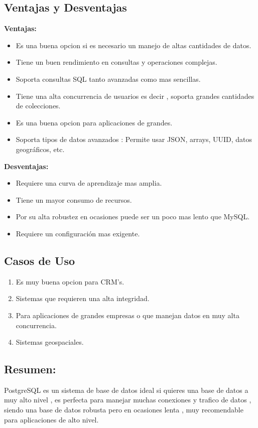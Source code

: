 \documentclass[12pt]{article}
\begin{document}
\subsection{Ventajas y Desventajas}
\textbf{Ventajas:}
\begin{itemize}
    \item Es una buena opcion si es necesario un manejo de altas cantidades de datos.
    \item Tiene un buen rendimiento en consultas y operaciones complejas.
    \item Soporta consultas SQL tanto avanzadas como mas sencillas.
    \item Tiene una alta concurrencia de usuarios es decir , soporta grandes cantidades de colecciones.
    \item Es una buena opcion para aplicaciones de grandes.
    \item Soporta tipos de datos avanzados : Permite usar JSON, arrays, UUID, datos geográficos, etc.
\end{itemize}
\vspace{0.5cm}

\textbf{Desventajas:}
\begin{itemize}
    \item Requiere una curva de aprendizaje mas amplia.
    \item Tiene un mayor consumo de recursos.
    \item Por su alta robustez en ocasiones puede ser un poco mas lento que MySQL.
    \item Requiere un configuración mas exigente.
\end{itemize}

\newpage
\vspace{1cm}
\subsection{Casos de Uso}
\begin{enumerate}
    \item Es muy buena opcion para CRM's.
    \item Sistemas que requieren una alta integridad.
    \item Para aplicaciones de grandes empresas o que manejan datos en muy alta concurrencia.
    \item Sistemas geospaciales.
\end{enumerate}

\vspace{1cm}
\subsection{Resumen:}
PostgreSQL es un sistema de base de datos ideal si quieres una base de datos a muy alto nivel , es perfecta para manejar muchas conexiones y trafico de datos , siendo una base de datos robusta pero en ocasiones lenta , muy recomendable para aplicaciones de alto nivel.
\end{document}

